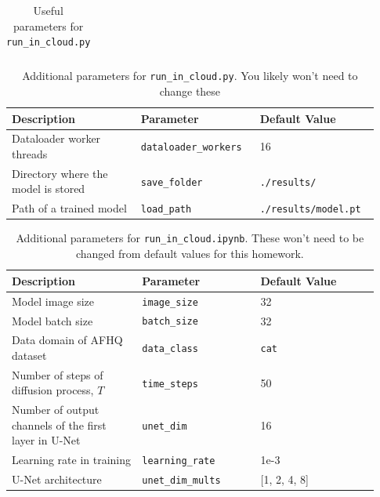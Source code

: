 \documentclass[11pt,addpoints,answers]{exam}
\begin{document}
\begin{questions}
\begin{table}[H]
\begin{tabular}{|p{0.33\linewidth}|p{0.3\linewidth}|p{0.3\linewidth}|}
\end{tabular}
\caption{Useful parameters for \lstinline{run_in_cloud.py}}
\label{table:flag}
\end{table}

\vspace{-1em}

\begin{table}[H]
\centering
\begin{tabular}{|p{0.33\linewidth}|p{0.3\linewidth}|p{0.3\linewidth}|}
\hline
Description & Parameter & Default Value \\ \hline
Dataloader worker threads  &  \lstinline|dataloader_workers| & 16 \\ \hline
Directory where the model is stored &  \lstinline|save_folder| & \lstinline|./results/| \\ \hline
Path of a trained model &  \lstinline|load_path| & \lstinline|./results/model.pt| \\ \hline

\end{tabular}
\caption{Additional parameters for \lstinline{run_in_cloud.py}. You likely won't need to change these}
\label{table:additional}
\end{table}

\vspace{-1em}

\begin{table}[H]
\centering
\begin{tabular}{|p{0.33\linewidth}|p{0.3\linewidth}|p{0.3\linewidth}|}
\hline
Description & Parameter & Default Value \\ \hline
Model image size &  \lstinline|image_size| & 32 \\ \hline
Model batch size &  \lstinline|batch_size | & 32 \\ \hline
Data domain of AFHQ dataset &  \lstinline|data_class| & \lstinline|cat| \\ \hline

Number of steps of diffusion process, $T$  &  \lstinline|time_steps| & 50 \\ \hline

Number of output channels of the first layer in U-Net  &  \lstinline|unet_dim| & 16 \\ \hline
Learning rate in training  &  \lstinline|learning_rate| & 1e-3 \\ \hline
U-Net architecture &  \lstinline|unet_dim_mults| & [1, 2, 4, 8] \\ \hline

\end{tabular}
\caption{Additional parameters for \lstinline{run_in_cloud.ipynb}. These won't need to be changed from default values for this homework.}
\label{table:default}
\end{table}



\end{questions}
\end{document}

